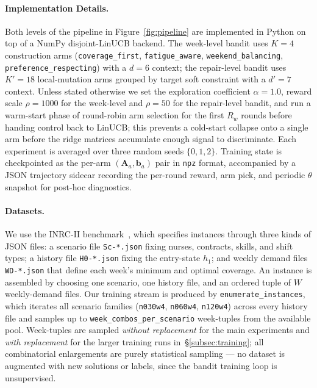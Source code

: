 \documentclass[11pt]{article}
\begin{document}
\paragraph{Implementation Details.}
Both levels of the pipeline in Figure~\ref{fig:pipeline} are
implemented in Python on top of a NumPy disjoint-LinUCB backend.
The week-level bandit uses $K = 4$ construction arms
(\texttt{coverage\_first}, \texttt{fatigue\_aware},
\texttt{weekend\_balancing}, \texttt{preference\_respecting}) with a
$d = 6$ context; the repair-level bandit uses $K' = 18$
local-mutation arms grouped by target soft constraint with a
$d' = 7$ context. Unless stated otherwise we set the exploration
coefficient $\alpha = 1.0$, reward scale $\rho = 1000$ for the
week-level and $\rho = 50$ for the repair-level bandit, and run a
warm-start phase of round-robin arm selection for the first $R_w$
rounds before handing control back to LinUCB; this prevents a
cold-start collapse onto a single arm before the ridge matrices
accumulate enough signal to discriminate. Each experiment is
averaged over three random seeds $\{0, 1, 2\}$. Training state is
checkpointed as the per-arm $(\mathbf{A}_a, \mathbf{b}_a)$ pair in
\texttt{npz} format, accompanied by a JSON trajectory sidecar
recording the per-round reward, arm pick, and periodic $\theta$
snapshot for post-hoc diagnostics.

\paragraph{Datasets.}
We use the INRC-II benchmark~\cite{ceschia2015inrc2}, which
specifies instances through three kinds of JSON files: a scenario
file \texttt{Sc-*.json} fixing nurses, contracts, skills, and shift
types; a history file \texttt{H0-*.json} fixing the entry-state
$h_1$; and weekly demand files \texttt{WD-*.json} that define each
week's minimum and optimal coverage. An instance is assembled by
choosing one scenario, one history file, and an ordered tuple of
$W$ weekly-demand files. Our training stream is produced by
\texttt{enumerate\_instances}, which iterates all scenario families
(\texttt{n030w4}, \texttt{n060w4}, \texttt{n120w4}) across every
history file and samples up to
\texttt{week\_combos\_per\_scenario} week-tuples from the available
pool. Week-tuples are sampled \emph{without replacement} for the
main experiments and \emph{with replacement} for the larger
training runs in~\S\ref{subsec:training}; all combinatorial
enlargements are purely statistical sampling --- no dataset is
augmented with new solutions or labels, since the bandit training
loop is unsupervised.
\end{document}
